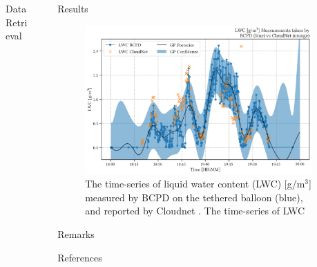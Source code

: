 \documentclass[final]{beamer}
\newlength{\sepwidth}
\newlength{\colwidth}
\newcommand{\separatorcolumn}{\begin{column}{\sepwidth}\end{column}}
\begin{document}
\begin{frame}[t]
\begin{columns}[t]
\begin{column}{\colwidth}
\begin{exampleblock}{Data Retrieval}
      \end{exampleblock}

    \end{column}
    \separatorcolumn

    \begin{column}{\colwidth}

      \begin{alertblock}{Results}

        \begin{figure}
          \centering
          \includegraphics[width=0.95\colwidth]{img/ts_gp.png}
          \caption{The time-series of liquid water content (LWC) [g/m$^3$] measured by BCPD on the tethered balloon (blue), and reported by Cloudnet \cite{illingworth2007cloudnet}. The time-series of LWC }
          \label{fig:03}
        \end{figure}

      \end{alertblock}

      \begin{block}{Remarks}

      \end{block}

      \begin{block}{References}

        \nocite{*}
        \footnotesize{}

      \end{block}

    \end{column}

    \separatorcolumn
  \end{columns}
\end{frame}
\end{document}
